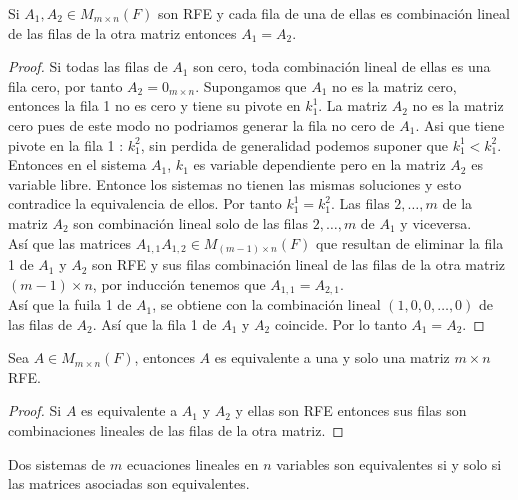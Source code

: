 \documentclass[12pt,a4paper]{book}
\begin{document}
    \begin{proposicion}
        Si $A_{1},A_{2}\in M_{m\times n}(F)$ son RFE y cada fila de una de ellas es
        combinación lineal de las filas de la otra matriz entonces $A_{1}=A_{2}$.
    \end{proposicion}

    \begin{proof}
        Si todas las filas de $A_{1}$ son cero, toda combinación lineal de ellas es una fila cero,
        por tanto $A_{2}=0_{m\times n}$. Supongamos que $A_{1}$ no es la matriz cero, entonces la fila
        1 no es cero y tiene su pivote en $k_{1}^{1}$. La matriz $A_{2}$ no es la matriz cero pues de este modo
        no podriamos generar la fila no cero de $A_{1}$. Asi que tiene pivote en la fila 1 : $k_{1}^{2}$,
        sin perdida de generalidad podemos suponer que $k_{1}^{1}\lt k_{1}^{2}$. Entonces en el sistema $A_{1}$,
        $k_{1}$ es variable dependiente pero en la matriz $A_{2}$ es variable libre. Entonce los sistemas no tienen
        las mismas soluciones y esto contradice la equivalencia de ellos. Por tanto $k_{1}^{1}=k_{1}^{2}$.
        Las filas $2,\dots,m$ de la matriz $A_{2}$ son combinación lineal solo de las filas
        $2,\dots,m$ de $A_{1}$ y viceversa.\\
        Así que las matrices $A_{1,1}A_{1,2}\in M_{(m-1)\times n}(F)$ que
        resultan de eliminar la fila 1 de $A_{1}$ y $A_{2}$ son RFE y sus filas combinación lineal de las filas
        de la otra matriz $(m-1)\times n$, por inducción tenemos que $A_{1,1}=A_{2,1}$.\\
        Así que la fuila 1 de $A_{1}$, se obtiene con la combinación lineal $(1,0,0,\dots,0)$ de las filas de $A_{2}$.
        Así que la fila 1 de $A_{1}$ y $A_{2}$ coincide. Por lo tanto $A_{1}=A_{2}$.
    \end{proof}

    \begin{corolario}
        Sea $A\in M_{m\times n}(F)$, entonces $A$ es equivalente a una y solo una matriz $m\times n$ RFE.
    \end{corolario}

    \begin{proof}
        Si $A$ es equivalente a $A_{1}$ y $A_{2}$ y ellas son RFE entonces sus filas
        son combinaciones lineales de las filas de la otra matriz.
    \end{proof}

    \begin{proposicion}
        Dos sistemas de $m$ ecuaciones lineales en $n$ variables son equivalentes si
        y solo si las matrices asociadas son equivalentes.
    \end{proposicion}
\end{document}
